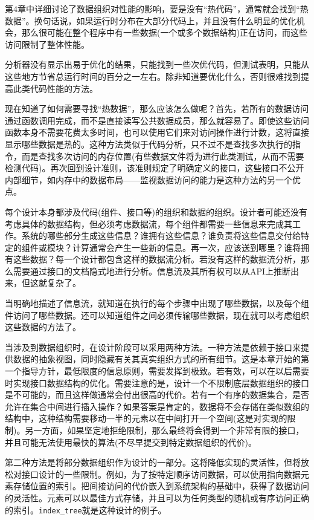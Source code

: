 第4章中详细讨论了数据组织对性能的影响，要是没有“热代码”，通常就会找到“热数据”。换句话说，如果运行时分布在大部分代码上，并且没有什么明显的优化机会，那么很可能在整个程序中有一些数据(一个或多个数据结构)正在访问，而这些访问限制了整体性能。

分析器没有显示出易于优化的结果，只能找到一些次优代码，但测试表明，只能从这些地方节省总运行时间的百分之一左右。除非知道要优化什么，否则很难找到提高此类代码性能的方法。 

现在知道了如何需要寻找“热数据”，那么应该怎么做呢？首先，若所有的数据访问通过函数调用完成，而不是直接读写公共数据成员，那么就容易了。即使这些访问函数本身不需要花费太多时间，也可以使用它们来对访问操作进行计数，这将直接显示哪些数据是热的。这种方法类似于代码分析，只不过不是查找多次执行的指令，而是查找多次访问的内存位置(有些数据文件将为进行此类测试，从而不需要检测代码)。再次回到设计准则，该准则规定了明确定义的接口，这些接口不公开内部细节，如内存中的数据布局——监视数据访问的能力是这种方法的另一个优点。

每个设计本身都涉及代码(组件、接口等)的组织和数据的组织。设计者可能还没有考虑具体的数据结构，但必须考虑数据流，每个组件都需要一些信息来完成其工作。系统的哪些部分生成这些信息？谁拥有这些信息？谁负责将这些信息交付给特定的组件或模块？计算通常会产生一些新的信息。再一次，应该送到哪里？谁将拥有这些数据？每一个设计都包含这样的数据流分析。若没有这样的数据流分析，那么需要通过接口的文档隐式地进行分析。信息流及其所有权可以从API上推断出来，但这就复杂了。 

当明确地描述了信息流，就知道在执行的每个步骤中出现了哪些数据，以及每个组件访问了哪些数据。还可以知道组件之间必须传输哪些数据，现在就可以考虑组织这些数据的方法了。

当涉及到数据组织时，在设计阶段可以采用两种方法。一种方法是依赖于接口来提供数据的抽象视图，同时隐藏有关其真实组织方式的所有细节。这是本章开始的第一个指导方针，最低限度的信息原则，需要发挥到极致。若有效，可以在以后需要时实现接口数据结构的优化。需要注意的是，设计一个不限制底层数据组织的接口是不可能的，而且这样做通常会付出很高的代价。若有一个有序的数据集合，是否允许在集合中间进行插入操作？如果答案是肯定的，数据将不会存储在类似数组的结构中，这种结构需要移动一半的元素以在中间打开一个空间(这是对实现的限制)。另一方面，如果坚定地拒绝限制，那么最终将会得到一个非常有限的接口，并且可能无法使用最快的算法(不尽早提交到特定数据组织的代价)。

第二种方法是将部分数据组织作为设计的一部分。这将降低实现的灵活性，但将放松对接口设计的一些限制。例如，为了按特定顺序访问数据，可以使用指向数据元素存储位置的索引。把间接访问的代价嵌入到系统架构的基础中，获得了数据访问的灵活性。元素可以以最佳方式存储，并且可以为任何类型的随机或有序访问正确的索引。\texttt{index\_tree}就是这种设计的例子。 

